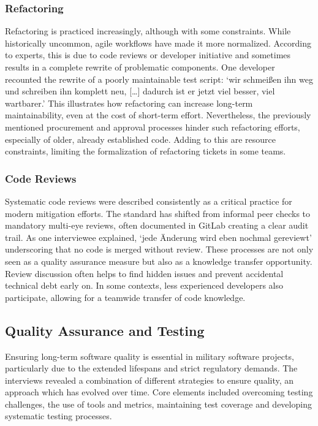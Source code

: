 \subsubsection{Refactoring}
Refactoring is practiced increasingly, although with some constraints. While historically uncommon, agile workflows have made it more normalized. According to experts, this is due to code reviews or developer initiative and sometimes results in a complete rewrite of problematic components.
One developer recounted the rewrite of a poorly maintainable test script: `wir schmeißen ihn weg und schreiben ihn komplett neu, [\ldots] dadurch ist er jetzt viel besser, viel wartbarer.' This illustrates how refactoring can increase long-term maintainability, even at the cost of short-term effort.
Nevertheless, the previously mentioned procurement and approval processes hinder such refactoring efforts, especially of older, already established code. Adding to this are resource constraints, limiting the formalization of refactoring tickets in some teams.\\

\subsubsection{Code Reviews}
Systematic code reviews were described consistently as a critical practice for modern mitigation efforts. The standard has shifted from informal peer checks to mandatory multi-eye reviews, often documented in GitLab creating a clear audit trail. As one interviewee explained, `jede Änderung wird eben nochmal gereviewt'
underscoring that no code is merged without review. These processes are not only seen as a quality assurance measure but also as a knowledge transfer opportunity. Review discussion often helps to find hidden issues and prevent accidental technical debt early on. In some contexts,
less experienced developers also participate, allowing for a teamwide transfer of code knowledge.\\

\subsection{Quality Assurance and Testing}
Ensuring long-term software quality is essential in military software projects, particularly due to the extended lifespans and strict regulatory demands. The interviews revealed a combination of different strategies to ensure quality, an approach which has evolved over time.
Core elements included overcoming testing challenges, the use of tools and metrics, maintaining test coverage and developing systematic testing processes.

